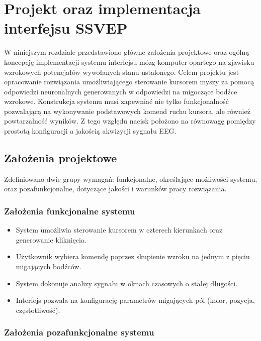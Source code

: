 
\chapter{Projekt oraz implementacja interfejsu SSVEP}

W niniejszym rozdziale przedstawiono główne założenia projektowe oraz ogólną koncepcję implementacji systemu interfejsu mózg-komputer opartego na zjawisku wzrokowych potencjałów wywołanych stanu ustalonego.
Celem projektu jest opracowanie rozwiązania umożliwiającego sterowanie kursorem myszy za pomocą odpowiedzi neuronalnych generowanych w odpowiedzi na migoczące bodźce wzrokowe.
Konstrukcja systemu musi zapewniać nie tylko funkcjonalność pozwalającą na wykonywanie podstawowych komend ruchu kursora, ale również powtarzalność wyników.
Z tego względu nacisk położono na równowagę pomiędzy prostotą konfiguracji a jakością akwizycji sygnału EEG.

\section{Założenia projektowe}

Zdefiniowano dwie grupy wymagań: funkcjonalne, określające możliwości systemu, oraz pozafunkcjonalne, dotyczące jakości i warunków pracy rozwiązania.

\subsection*{Założenia funkcjonalne systemu} 

\begin{itemize}
    \item System umożliwia sterowanie kursorem w czterech kierunkach oraz generowanie kliknięcia.
    \item Użytkownik wybiera komendę poprzez skupienie wzroku na jednym z pięciu migających bodźców.
    \item System dokonuje analizy sygnału w oknach czasowych o stałej długości.
    \item Interfejs pozwala na konfigurację parametrów migających pól (kolor, pozycja, częstotliwość).
\end{itemize}

\subsection*{Założenia pozafunkcjonalne systemu} 

